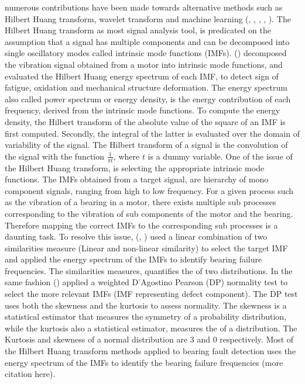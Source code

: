 \documentclass[../Main/thesis.tex]{subfiles}
\begin{document}
numerous contributions have been made towards alternative methods such as Hilbert Huang transform, wavelet transform and machine learning (\cite{zhang2019}, \cite{xiaoan2018}, \cite{rai2016}, \cite{konar2011}, \cite{rai2006} ).
\justify
The Hilbert Huang transform as most signal analysis tool, is predicated on the assumption that a signal has multiple components and can be decomposed into single oscillatory modes called intrinsic mode functions (IMFs). 
(\cite{fan2016}) decomposed the vibration signal obtained from a motor into intrinsic mode functions, and evaluated the Hilbert Huang energy spectrum of each IMF, to detect sign of fatigue, oxidation and mechanical structure deformation. The energy spectrum also called power spectrum or energy density, is the energy contribution of each frequency, derived from the intrinsic mode functions.
To compute the energy density, the Hilbert transform of the absolute value of the square of an IMF is first computed. Secondly, the integral of the latter is evaluated over the domain of variability of the signal. The Hilbert transform of a signal is the convolution of the signal with the function $\frac{1}{\pi t}$, where $t$ is a dummy variable.
\justify
One of the issue of the Hilbert Huang transform, is selecting the appropriate intrinsic mode functions. The IMFs obtained from a target signal, are hierarchy of mono component signals, ranging from high to low frequency. For a given process such as the vibration of a bearing in a motor, there exists multiple sub processes corresponding to the vibration of sub components of the motor and the bearing. Therefore mapping the correct IMFs to the corresponding sub processes is a daunting task. To resolve this issue, (\cite{osman2013a}, \cite{osman2013b} ) used a linear combination of two similarities measure (Linear and non-linear similarity) to select the target IMF and applied the energy spectrum of the IMFs to identify bearing failure frequencies. The similarities measures, quantifies the  of two distributions.
In the same fashion (\cite{osman2014}) applied a weighted D'Agostino Pearson (DP) normality test to select the more relevant IMFs (IMF representing defect component). The DP test uses both the skewness and the kurtosis to assess normality.
The skewness is a statistical estimator that measures the symmetry of a probability distribution, while the kurtosis also a statistical estimator, measures the  of a distribution. The Kurtosis and skewness of a normal distribution are 3 and 0 respectively.
Most of the Hilbert Huang transform methods applied to bearing fault detection uses the energy spectrum of the IMFs to identify the bearing failure frequencies (more citation here).
\end{document}
